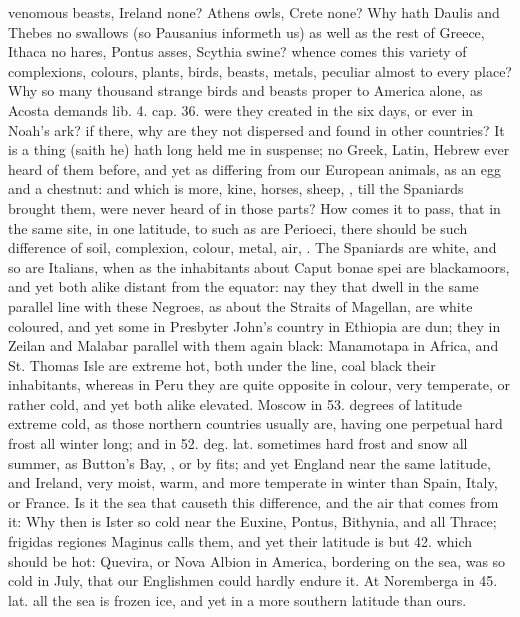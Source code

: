 {venomous beasts, Ireland none? Athens owls, Crete none? Why hath
Daulis and Thebes no swallows (so Pausanius informeth us) as well as
the rest of Greece, Ithaca no hares, Pontus asses, Scythia swine?
whence comes this variety of complexions, colours, plants, birds,
beasts, metals, peculiar almost to every place? Why so many
thousand strange birds and beasts proper to America alone, as Acosta
demands lib. 4. cap. 36. were they created in the six days, or ever in
Noah's ark? if there, why are they not dispersed and found in other
countries? It is a thing (saith he) hath long held me in suspense; no
Greek, Latin, Hebrew ever heard of them before, and yet as differing
from our European animals, as an egg and a chestnut: and which is more,
kine, horses, sheep, \etc{}, till the Spaniards brought them, were never
heard of in those parts? How comes it to pass, that in the same site,
in one latitude, to such as are Perioeci, there should be such
difference of soil, complexion, colour, metal, air, \etc{}. The Spaniards
are white, and so are Italians, when as the inhabitants about
Caput bonae spei are blackamoors, and yet both alike distant from
the equator: nay they that dwell in the same parallel line with these
Negroes, as about the Straits of Magellan, are white coloured, and yet
some in Presbyter John's country in Ethiopia are dun; they in Zeilan
and Malabar parallel with them again black: Manamotapa in Africa, and
St. Thomas Isle are extreme hot, both under the line, coal black their
inhabitants, whereas in Peru they are quite opposite in colour, very
temperate, or rather cold, and yet both alike elevated. Moscow in 53.
degrees of latitude extreme cold, as those northern countries usually
are, having one perpetual hard frost all winter long; and in 52. deg.
lat. sometimes hard frost and snow all summer, as Button's Bay, \etc{}, or
by fits; and yet England near the same latitude, and Ireland,
very moist, warm, and more temperate in winter than Spain, Italy, or
France. Is it the sea that causeth this difference, and the air that
comes from it: Why then is Ister so cold near the Euxine, Pontus,
Bithynia, and all Thrace; frigidas regiones Maginus calls them, and yet
their latitude is but 42. which should be hot:  Quevira, or Nova
Albion in America, bordering on the sea, was so cold in July, that our
Englishmen could hardly endure it. At Noremberga in 45. lat. all
the sea is frozen ice, and yet in a more southern latitude than ours.
}
